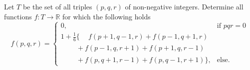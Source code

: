 Let $T$ be the set of all triples $(p,q,r)$ of non-negative integers. Determine all
functions $f\colon T \rightarrow \mathbb{R}$ for which the following holds
$$f(p,q,r)= \begin{cases}
    0,&\text{if }pqr=0\\
    1+\frac{1}{6}\{\phantom{+}f(p+1,q-1,r)+f(p-1,q+1,r)\\
    \phantom{1+\frac{1}{6}}+f(p-1,q,r+1)+f(p+1,q,r-1)\\
    \phantom{1+\frac{1}{6}}+f(p,q+1,r-1)+f(p,q-1,r+1)\},&\text{else.}
\end{cases}$$
